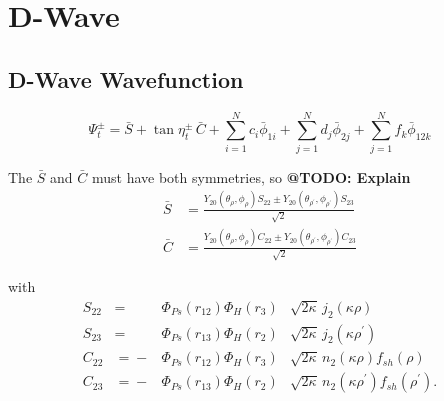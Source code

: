\documentclass[Dissertation.tex]{subfiles}
\begin{document}
\chapter{D-Wave}
\label{chp:DWave}


\section{D-Wave Wavefunction}
\label{sec:DWaveFn}

\begin{equation}
\Psi_t^\pm = \bar{S} + \tan \eta_t^\pm \, \bar{C} + \sum_{i=1}^N c_i \bar{\phi}_{1i} + \sum_{j=1}^N d_j \bar{\phi}_{2j} + \sum_{j=1}^N f_k \bar{\phi}_{12k}
\label{eq:DWaveSimple}
\end{equation}





\noindent The $\bar{S}$ and $\bar{C}$ must have both symmetries, so \textbf{@TODO: Explain}
\begin{subequations}
\label{eq:DWaveSandCBar}
\begin{align}
\bar{S} &= \frac{Y_{20}(\theta_\rho,\phi_\rho)S_{22} \pm Y_{20}(\theta_{\rho^\prime},\phi_{\rho^\prime})S_{23} }{\sqrt{2}} \label{eq:DWaveSBar} \\
\bar{C} &= \frac{Y_{20}(\theta_\rho,\phi_\rho)C_{22} \pm Y_{20}(\theta_{\rho^\prime},\phi_{\rho^\prime})C_{23} }{\sqrt{2}} \label{eq:DWaveCBar} 
\end{align}
\end{subequations}

\noindent with
\begin{subequations}
\label{eq:DWaveSandC}
\begin{alignat}{2}
S_{22} &={}&\Phi_{Ps}\left(r_{12}\right) \Phi_H\left(r_3\right) &\sqrt{2\kappa} \,j_2\!\left(\kappa\rho\right) \label{eq:DWaveS22Def} \\
S_{23} &={}&\Phi_{Ps}\left(r_{13}\right) \Phi_H\left(r_2\right) &\sqrt{2\kappa} \,j_2\!\left(\kappa\rho^\prime\right) \label{eq:DWaveS23Def} \\
C_{22} &={}-&\Phi_{Ps}\left(r_{12}\right) \Phi_H\left(r_3\right) &\sqrt{2\kappa} \,n_2\!\left(\kappa\rho\right) f_{sh}(\rho) \label{eq:DWaveC22Def} \\
C_{23} &={}-&\Phi_{Ps}\left(r_{13}\right) \Phi_H\left(r_2\right) &\sqrt{2\kappa} \,n_2\!\left(\kappa\rho^\prime\right) f_{sh}(\rho^\prime). \label{eq:DWaveC23Def}
\end{alignat}
\end{subequations}
\end{document}
